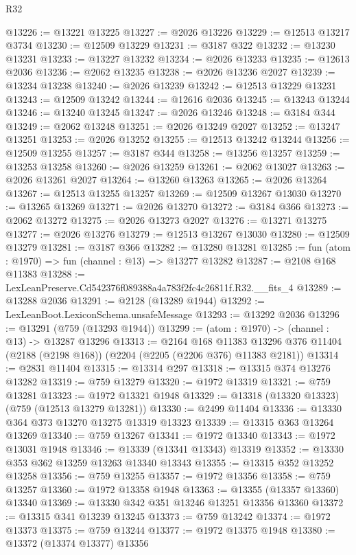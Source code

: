 \begin{lexlean}{R32}
\begin{coremodule}
@13226 := @13221 @13225
@13227 := @2026 @13226
@13229 := @12513 @13217 @3734
@13230 := @12509 @13229
@13231 := @3187 @322
@13232 := @13230 @13231
@13233 := @13227 @13232
@13234 := @2026 @13233
@13235 := @12613 @2036
@13236 := @2062 @13235
@13238 := @2026 @13236 @2027
@13239 := @13234 @13238
@13240 := @2026 @13239
@13242 := @12513 @13229 @13231
@13243 := @12509 @13242
@13244 := @12616 @2036
@13245 := @13243 @13244
@13246 := @13240 @13245
@13247 := @2026 @13246
@13248 := @3184 @344
@13249 := @2062 @13248
@13251 := @2026 @13249 @2027
@13252 := @13247 @13251
@13253 := @2026 @13252
@13255 := @12513 @13242 @13244
@13256 := @12509 @13255
@13257 := @3187 @344
@13258 := @13256 @13257
@13259 := @13253 @13258
@13260 := @2026 @13259
@13261 := @2062 @13027
@13263 := @2026 @13261 @2027
@13264 := @13260 @13263
@13265 := @2026 @13264
@13267 := @12513 @13255 @13257
@13269 := @12509 @13267 @13030
@13270 := @13265 @13269
@13271 := @2026 @13270
@13272 := @3184 @366
@13273 := @2062 @13272
@13275 := @2026 @13273 @2027
@13276 := @13271 @13275
@13277 := @2026 @13276
@13279 := @12513 @13267 @13030
@13280 := @12509 @13279
@13281 := @3187 @366
@13282 := @13280 @13281
@13285 := fun (atom : @1970) => fun (channel : @13) => @13277 @13282
@13287 := @2108 @168 @11383
@13288 := LexLeanPreserve.Cd542376f089388a4a783f2fc4c26811f.R32.__fits_4
@13289 := @13288 @2036
@13291 := @2128 (@13289 @1944)
@13292 := LexLeanBoot.LexiconSchema.unsafeMessage
@13293 := @13292 @2036
@13296 := @13291 (@759 (@13293 @1944))
@13299 := (atom : @1970) -> (channel : @13) -> @13287 @13296
@13313 := @2164
    @168
    @11383
    @13296
    @376
    @11404
    (@2188 (@2198 @168))
    (@2204 (@2205 (@2206 @376) @11383 @2181))
@13314 := @2831 @11404
@13315 := @13314 @297
@13318 := @13315 @374 @13276 @13282
@13319 := @759 @13279
@13320 := @1972 @13319
@13321 := @759 @13281
@13323 := @1972 @13321 @1948
@13329 := @13318 (@13320 @13323) (@759 (@12513 @13279 @13281))
@13330 := @2499 @11404
@13336 := @13330 @364 @373 @13270 @13275 @13319 @13323
@13339 := @13315 @363 @13264 @13269
@13340 := @759 @13267
@13341 := @1972 @13340
@13343 := @1972 @13031 @1948
@13346 := @13339 (@13341 @13343) @13319
@13352 := @13330 @353 @362 @13259 @13263 @13340 @13343
@13355 := @13315 @352 @13252 @13258
@13356 := @759 @13255
@13357 := @1972 @13356
@13358 := @759 @13257
@13360 := @1972 @13358 @1948
@13363 := @13355 (@13357 @13360) @13340
@13369 := @13330 @342 @351 @13246 @13251 @13356 @13360
@13372 := @13315 @341 @13239 @13245
@13373 := @759 @13242
@13374 := @1972 @13373
@13375 := @759 @13244
@13377 := @1972 @13375 @1948
@13380 := @13372 (@13374 @13377) @13356

\end{coremodule}
\end{lexlean}
